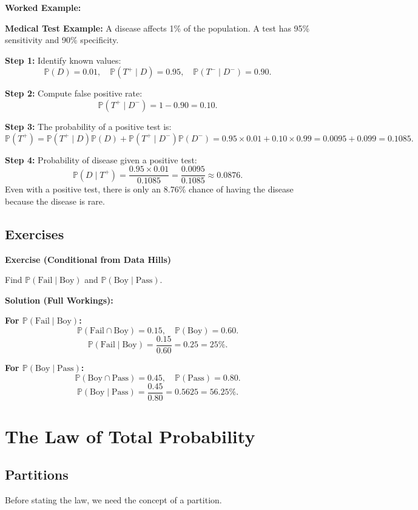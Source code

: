 \documentclass[12pt,a4paper,oneside]{report}
\theoremstyle{mytheorem}
\theoremstyle{mydefinition}
\theoremstyle{myremark}
\newenvironment{exercise}[1]{%
  \par\medskip\noindent\textbf{\color{myblue}Exercise (#1)}\par\smallskip
}{%
  \par\smallskip
}
\newenvironment{solution}{%
  \par\noindent\textbf{\color{mygreen}Solution (Full Workings):}\par\smallskip
}{%
  \par\bigskip
}
\newenvironment{worked}{%
  \par\medskip\noindent\textbf{\color{myorange}Worked Example:}\par\smallskip
}{%
  \par\medskip
}
\newcommand{\Prob}{\mathbb{P}}
\begin{document}
\begin{worked}
\textbf{Medical Test Example:}
A disease affects 1\% of the population. A test has 95\% sensitivity and 90\% specificity.

\textbf{Step 1:} Identify known values:
\[
\Prob(D) = 0.01,\quad \Prob(T^+ \mid D) = 0.95,\quad \Prob(T^- \mid D^-) = 0.90.
\]

\textbf{Step 2:} Compute false positive rate:
\[
\Prob(T^+ \mid D^-) = 1 - 0.90 = 0.10.
\]

\textbf{Step 3:} The probability of a positive test is:
\[
\Prob(T^+) = \Prob(T^+ \mid D)\Prob(D) + \Prob(T^+ \mid D^-)\Prob(D^-)
= 0.95 \times 0.01 + 0.10 \times 0.99 = 0.0095 + 0.099 = 0.1085.
\]

\textbf{Step 4:} Probability of disease given a positive test:
\[
\Prob(D \mid T^+) = \frac{0.95 \times 0.01}{0.1085} = \frac{0.0095}{0.1085} \approx 0.0876.
\]
Even with a positive test, there is only an 8.76\% chance of having the disease because the disease is rare.
\end{worked}

\section{Exercises}
\begin{exercise}{Conditional from Data Hills}
Find $\Prob(\text{Fail} \mid \text{Boy})$ and $\Prob(\text{Boy} \mid \text{Pass})$.
\end{exercise}
\begin{solution}
\textbf{For $\Prob(\text{Fail} \mid \text{Boy})$:}
\[
\Prob(\text{Fail} \cap \text{Boy}) = 0.15,\quad \Prob(\text{Boy}) = 0.60.
\]
\[
\Prob(\text{Fail} \mid \text{Boy}) = \frac{0.15}{0.60} = 0.25 = 25\%.
\]

\textbf{For $\Prob(\text{Boy} \mid \text{Pass})$:}
\[
\Prob(\text{Boy} \cap \text{Pass}) = 0.45,\quad \Prob(\text{Pass}) = 0.80.
\]
\[
\Prob(\text{Boy} \mid \text{Pass}) = \frac{0.45}{0.80} = 0.5625 = 56.25\%.
\]
\end{solution}

\chapter{The Law of Total Probability}

\section{Partitions}
Before stating the law, we need the concept of a partition.
\end{document}

